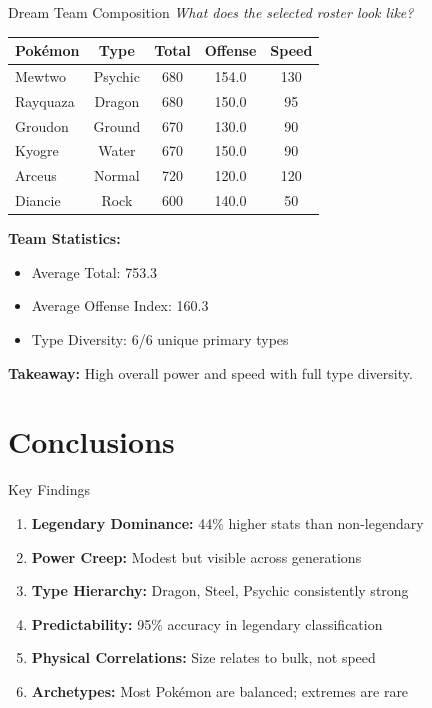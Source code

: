 \documentclass[t,aspectratio=169,12pt]{beamer}
\begin{document}
\begin{frame}{Dream Team Composition}
  \textit{What does the selected roster look like?}
  \begin{center}
    {\scriptsize\begin{tabular}{lcccc}
      \hline
      Pokémon & Type & Total & Offense & Speed \\
      \hline
      Mewtwo & Psychic & 680 & 154.0 & 130 \\
      Rayquaza & Dragon & 680 & 150.0 & 95 \\
      Groudon & Ground & 670 & 130.0 & 90 \\
      Kyogre & Water & 670 & 150.0 & 90 \\
      Arceus & Normal & 720 & 120.0 & 120 \\
      Diancie & Rock & 600 & 140.0 & 50 \\
      \hline
    \end{tabular}}
  \end{center}
  
  \vspace{0.1cm}
  {\scriptsize\textbf{Team Statistics:}
  \begin{itemize}\setlength{\itemsep}{0pt}\setlength{\parsep}{0pt}
    \item Average Total: 753.3
    \item Average Offense Index: 160.3
    \item Type Diversity: 6/6 unique primary types
  \end{itemize}}

  \smallskip
  \textbf{Takeaway:} High overall power and speed with full type diversity.
\end{frame}

\section{Conclusions}

\begin{frame}{Key Findings}
  {\small\begin{enumerate}
    \item \textbf{Legendary Dominance:} 44\% higher stats than non-legendary
    \item \textbf{Power Creep:} Modest but visible across generations
    \item \textbf{Type Hierarchy:} Dragon, Steel, Psychic consistently strong
    \item \textbf{Predictability:} 95\% accuracy in legendary classification
    \item \textbf{Physical Correlations:} Size relates to bulk, not speed
    \item \textbf{Archetypes:} Most Pokémon are balanced; extremes are rare
  \end{enumerate}}
\end{frame}
\end{document}
